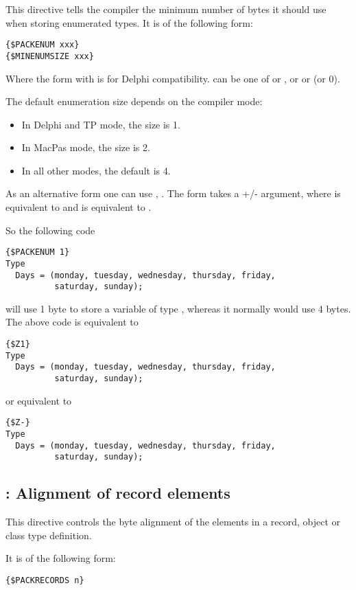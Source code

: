 This directive tells the compiler the minimum number of bytes it should
use when storing enumerated types. It is of the following form:
\begin{verbatim}
{$PACKENUM xxx}
{$MINENUMSIZE xxx}
\end{verbatim}
Where the form with  is for Delphi compatibility.
 can be one of  or , or  or
 (or 0).

The default enumeration size depends on the compiler mode:
\begin{itemize}
\item In Delphi and TP mode, the size is 1.
\item In MacPas mode, the size is 2.
\item In all other modes, the default is 4.
\end{itemize}

As an alternative form one can use , 
. The  form takes a +/- argument, 
where \var{+} is equivalent to  and \var{-} is 
equivalent to .

So the following code
\begin{verbatim}
{$PACKENUM 1}
Type
  Days = (monday, tuesday, wednesday, thursday, friday,
          saturday, sunday);
\end{verbatim}
will use 1 byte to store a variable of type , whereas it normally
would use 4 bytes. The above code is equivalent to
\begin{verbatim}
{$Z1}
Type
  Days = (monday, tuesday, wednesday, thursday, friday,
          saturday, sunday);
\end{verbatim}
or equivalent to
\begin{verbatim}
{$Z-}
Type
  Days = (monday, tuesday, wednesday, thursday, friday,
          saturday, sunday);
\end{verbatim}

\subsection{ : Alignment of record elements}
\label{se:Packrecords}
This directive controls the byte alignment of the elements in a record,
object or class type definition. 

It is of the following form:
\begin{verbatim}
{$PACKRECORDS n}
\end{verbatim}

